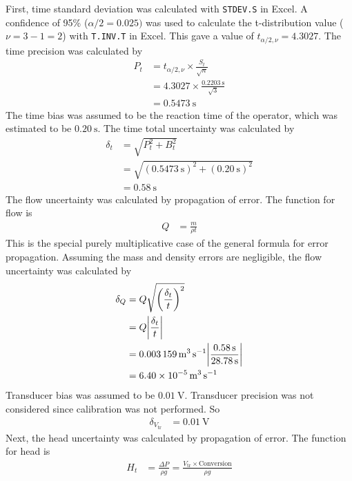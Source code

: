 First, time standard deviation was calculated with \texttt{STDEV.S} in Excel. A confidence of 95\% ($\alpha/2 = 0.025)$ was used to calculate the t-distribution value ($\nu = 3 - 1 = 2$) with \texttt{T.INV.T} in Excel. This gave a value of $t_{\alpha/2, \nu} = 4.3027$. The time precision was calculated by
\begin{align*}
    P_t &= t_{\alpha/2, \nu} \times \frac{S_t}{\sqrt{n}} \\
    &= 4.3027 \times \frac{\qty{0.2203}{\second}}{\sqrt{3}} \\
    &= \qty{0.5473}{\second}
\end{align*}
The time bias was assumed to be the reaction time of the operator, which was estimated to be $\qty{0.20}{\second}$. The time total uncertainty was calculated by
\begin{align*}
    \delta_t &= \sqrt{P_t^2 + B_t^2} \\
    &= \sqrt{(\qty{0.5473}{\second})^2 + (\qty{0.20}{\second})^2} \\
    &= \qty{0.58}{\second}
\end{align*}
The flow uncertainty was calculated by propagation of error. The function for flow is
\begin{align*}
    Q &= \frac{m}{\rho t} 
\end{align*}
This is the special purely multiplicative case of the general formula for error propagation. Assuming the mass and density errors are negligible, the flow uncertainty was calculated by
\begin{align*}
    \delta_Q &= Q \sqrt{\left(\frac{\delta_t}{t}\right)^2} \\
    &= Q \bigg|\frac{\delta_t}{t}\bigg| \\
    &= \qty{0.003159}{\meter\cubed\per\second} \bigg|\frac{\qty{0.58}{\second}}{\qty{28.78}{\second}}\bigg| \\
    &= \qty{6.40E-05}{\meter\cubed\per\second}
\end{align*}
Transducer bias was assumed to be $\qty{0.01}{\volt}$. Transducer precision was not considered since calibration was not performed. So 
\begin{align*}
    \delta_{V_{\text{tr}}} &= \qty{0.01}{\volt}
\end{align*}
Next, the head uncertainty was calculated by propagation of error. The function for head is
\begin{align*}
    H_t &= \frac{\Delta P}{\rho g} = \frac{V_{\text{tr}} \times \text{Conversion}}{\rho g}
\end{align*}
